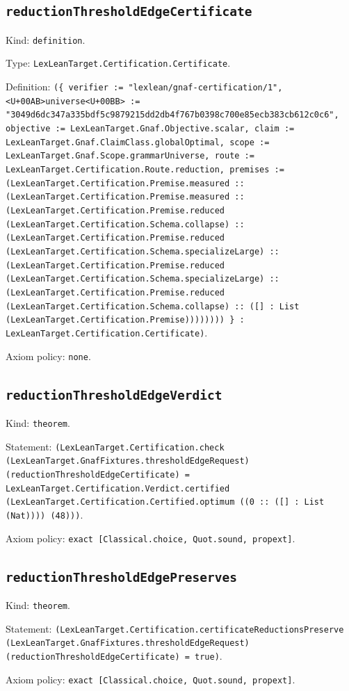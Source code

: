 \documentclass[11pt]{article}
\begin{document}
\subsection*{\texttt{reductionThresholdEdgeCertificate}}
\noindent Kind: \texttt{definition}.\par
\noindent Type: \texttt{LexLeanTarget.Certification.Certificate}.\par
\noindent Definition: \texttt{(\{ verifier := "lexlean/gnaf-certification/1", <U+00AB>universe<U+00BB> := "3049d6dc347a335bdf5c9879215dd2db4f767b0398c700e85ecb383cb612c0c6", objective := LexLeanTarget.Gnaf.Objective.scalar, claim := LexLeanTarget.Gnaf.ClaimClass.globalOptimal, scope := LexLeanTarget.Gnaf.Scope.grammarUniverse, route := LexLeanTarget.Certification.Route.reduction, premises := (LexLeanTarget.Certification.Premise.measured :: (LexLeanTarget.Certification.Premise.measured :: (LexLeanTarget.Certification.Premise.reduced (LexLeanTarget.Certification.Schema.collapse) :: (LexLeanTarget.Certification.Premise.reduced (LexLeanTarget.Certification.Schema.specializeLarge) :: (LexLeanTarget.Certification.Premise.reduced (LexLeanTarget.Certification.Schema.specializeLarge) :: (LexLeanTarget.Certification.Premise.reduced (LexLeanTarget.Certification.Schema.collapse) :: ([] : List (LexLeanTarget.Certification.Premise)))))))) \} : LexLeanTarget.Certification.Certificate)}.\par
\noindent Axiom policy: \texttt{none}.\par
\subsection*{\texttt{reductionThresholdEdgeVerdict}}
\noindent Kind: \texttt{theorem}.\par
\noindent Statement: \texttt{(LexLeanTarget.Certification.check (LexLeanTarget.GnafFixtures.thresholdEdgeRequest) (reductionThresholdEdgeCertificate) = LexLeanTarget.Certification.Verdict.certified (LexLeanTarget.Certification.Certified.optimum ((0 :: ([] : List (Nat)))) (48)))}.\par
\noindent Axiom policy: \texttt{exact [Classical.choice, Quot.sound, propext]}.\par
\subsection*{\texttt{reductionThresholdEdgePreserves}}
\noindent Kind: \texttt{theorem}.\par
\noindent Statement: \texttt{(LexLeanTarget.Certification.certificateReductionsPreserve (LexLeanTarget.GnafFixtures.thresholdEdgeRequest) (reductionThresholdEdgeCertificate) = true)}.\par
\noindent Axiom policy: \texttt{exact [Classical.choice, Quot.sound, propext]}.\par
\end{document}
